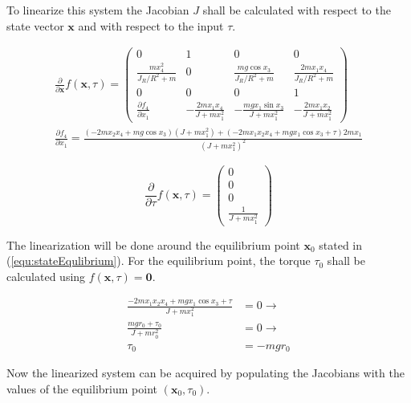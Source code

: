 \documentclass[a4paper, titlepage]{article}
\begin{document}
To linearize this system the Jacobian $J$ shall be calculated with respect to the state vector $\textbf{x}$ and with respect to the input $\tau$.

\begin{equation}
\begin{split}
\frac{\partial}{\partial \textbf{x}}f(\textbf{x}, \tau) = 
\begin{pmatrix}
0 & 1 & 0 & 0 \\
\frac{mx_4^2}{J_R/R^2 + m} & 0 & \frac{mg\cos{x_3}}{J_R/R^2 + m} & \frac{2mx_1x_4}{J_R/R^2 + m} \\
0 & 0 & 0 & 1 \\
\frac{\partial f_4}{\partial x_1} & -\frac{2mx_1x_4}{J + mx_1^2} & -\frac{mgx_1\sin{x_3}}{J + mx_1^2} & -\frac{2mx_1x_2}{J + mx_1^2}
\end{pmatrix} \\
\frac{\partial f_4}{\partial x_1} = \frac{(-2mx_2x_4 + mg\cos{x_3})(J + mx_1^2) + (-2mx_1x_2x_4 + mgx_1\cos{x_3} + \tau)2mx_1}{(J + mx_1^2)^2}
\end{split}
\label{stateJacobian}
\end{equation}

\begin{equation}
\frac{\partial}{\partial \tau}f(\textbf{x}, \tau) = 
\begin{pmatrix}
0 \\ 0 \\ 0 \\ \frac{1}{J + mx_1^2}
\end{pmatrix}
\label{equ:inputJacobian}
\end{equation}

The linearization will be done around the equilibrium point $\textbf{x}_0$ stated in (\ref{equ:stateEqulibrium}).
For the equilibrium point, the torque $\tau_0$ shall be calculated using $f(\textbf{x}, \tau) = \textbf{0}$.

\begin{equation}
\begin{split}
\frac{-2mx_1x_2x_4 + mgx_1\cos{x_3} + \tau}{J + mx_1^2} &= 0 \rightarrow \\
\frac{mgr_0 + \tau_0}{J + mr_0^2} &= 0 \rightarrow \\
\tau_0 &= -mgr_0
\end{split}
\end{equation}

Now the linearized system can be acquired by populating the Jacobians with the values of the equilibrium point $(\textbf{x}_0, \tau_0)$.
\end{document}

